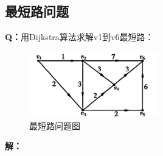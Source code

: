 \subsection{最短路问题}
\textbf{Q：}用Dijkstra算法求解v1到v6最短路：
\begin{figure}[H]
    \centering
    \includegraphics[width=0.5\textwidth]{./image/42.png}
    \caption{最短路问题图}
    \label{fig:Chapter4_Temporary_Pavilion_1}
\end{figure}
\textbf{解：}
